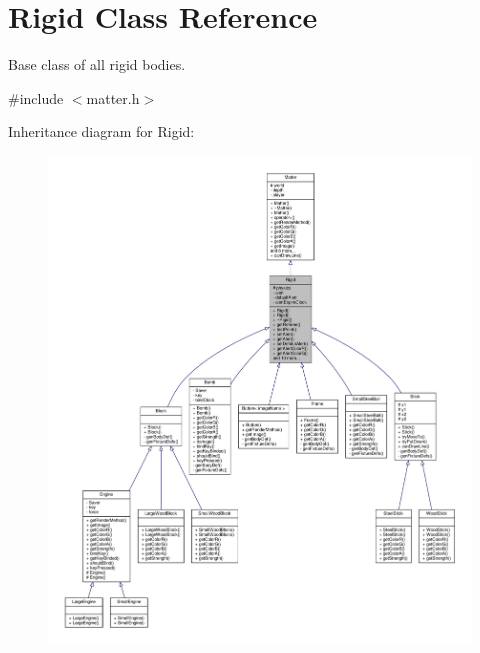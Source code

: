 \hypertarget{classRigid}{}\section{Rigid Class Reference}
\label{classRigid}


Base class of all rigid bodies.  




{\ttfamily \#include $<$matter.\+h$>$}



Inheritance diagram for Rigid\+:
\nopagebreak
\begin{figure}[H]
\begin{center}
\leavevmode
\includegraphics[width=350pt]{classRigid__inherit__graph}
\end{center}
\end{figure}


